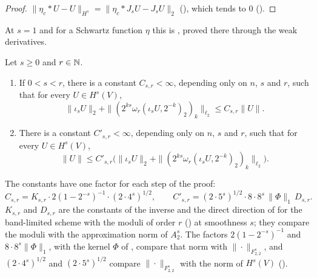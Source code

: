 \begin{proof}
\leanok
$\|\eta_c * U - U\|_{H^s} = \|\eta_c * J_s U - J_s U\|_2$
(), which tends to $0$ ().
\end{proof}

At $s = 1$ and for a Schwartz function $\eta$ this is ,
proved there through the weak derivatives.

\begin{theorem}
\label{thm:sobolev-besov-constants}
\leanok
{}
Let $s \geq 0$ and $r \in \mathbb{N}$.
\begin{enumerate}
  \item If $0 < s < r$, there is a constant $C_{s,r} < \infty$, depending only on $n$, $s$ and
    $r$, such that for every $U \in H^s(V)$,
    \[
      \|\iota_s U\|_2 + \|(2^{ks} \omega_r(\iota_s U, 2^{-k})_2)_k\|_{\ell_2} \leq C_{s,r} \|U\| .
    \]
  \item There is a constant $C'_{s,r} < \infty$, depending only on $n$, $s$ and $r$, such that
    for every $U \in H^s(V)$,
    \[
      \|U\| \leq C'_{s,r} \bigl(\|\iota_s U\|_2 +
      \|(2^{ks} \omega_r(\iota_s U, 2^{-k})_2)_k\|_{\ell_2}\bigr) .
    \]
\end{enumerate}
\end{theorem}

The constants have one factor for each step of the proof:
\[
  C_{s,r} = K_{s,r} \cdot 2 (1 - 2^{-s})^{-1} \cdot (2 \cdot 4^s)^{1/2}, \qquad
  C'_{s,r} = (2 \cdot 5^s)^{1/2} \cdot 8 \cdot 8^s \, \|\Phi\|_1 \, D_{s,r} .
\]
$K_{s,r}$ and $D_{s,r}$ are the constants of the inverse and the direct direction of
 for the band-limited scheme with the moduli of order $r$
() at smoothness $s$; they compare the moduli with the approximation norm of
$A^s_2$. The factors $2 (1 - 2^{-s})^{-1}$ and $8 \cdot 8^s \|\Phi\|_1$, with the kernel $\Phi$
of , compare that norm with $\|\cdot\|_{F^s_{2,2}}$, and
$(2 \cdot 4^s)^{1/2}$ and $(2 \cdot 5^s)^{1/2}$ compare $\|\cdot\|_{F^s_{2,2}}$ with the norm of
$H^s(V)$ ().

